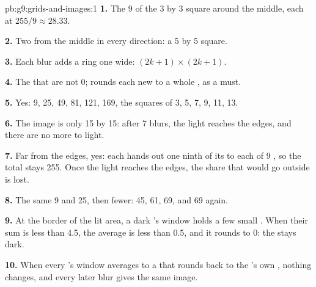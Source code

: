 \begin{solution}{pb:g9:grids-and-images:1}
\textbf{1.} The 9  of the 3 by 3 square around the middle, each at
$255 / 9 \approx 28.33$.

\textbf{2.} Two  from the middle in every direction: a 5 by 5 square.

\textbf{3.} Each blur adds a ring one  wide: $(2k + 1) \times (2k + 1)$.

\textbf{4.} The  that are not 0;  rounds each new  to a
whole , as a  must.

\textbf{5.} Yes: 9, 25, 49, 81, 121, 169, the squares of 3, 5, 7, 9, 11, 13.

\label{out:g9:grids-and-images:spread}

\textbf{6.} The image is only 15 by 15: after 7 blurs, the light reaches the
edges, and there are no more  to light.

\textbf{7.} Far from the edges, yes: each  hands out one ninth of its 
to each of 9 , so the total stays 255. Once the light reaches the edges,
the share that would go outside is lost.

\textbf{8.} The same 9 and 25, then fewer: 45, 61, 69, and 69 again.

\textbf{9.} At the border of the lit area, a dark 's window holds a few
small . When their sum is less than 4.5, the average is less than 0.5,
and it rounds to 0: the  stays dark.

\textbf{10.} When every 's window averages to a  that rounds back to
the 's own , nothing changes, and every later blur gives the same
image.


\end{solution}
